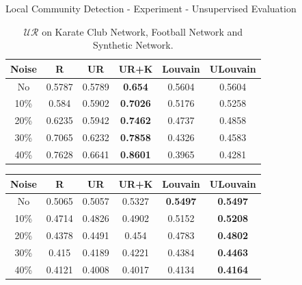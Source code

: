 \documentclass[9pt]{beamer}
\begin{document}
\begin{frame}{Local Community Detection - Experiment - Unsupervised Evaluation}

\tiny

\begin{table}[h]
\centering
\caption{$\mathcal{UR}$ on Karate Club Network, Football Network and Synthetic Network.}
\label{unsupervised_karate}
\begin{tabular}{c|c|c|c|c|c}
\hline
Noise & R      & UR     & UR+K            & Louvain & ULouvain \\ \hline
No    & 0.5787 & 0.5789 & \textbf{0.654}  & 0.5604  & 0.5604   \\ \hline
10\%  & 0.584  & 0.5902 & \textbf{0.7026} & 0.5176  & 0.5258   \\ \hline
20\%  & 0.6235 & 0.5942 & \textbf{0.7462} & 0.4737  & 0.4858   \\ \hline
30\%  & 0.7065 & 0.6232 & \textbf{0.7858} & 0.4326  & 0.4583   \\ \hline
40\%  & 0.7628 & 0.6641 & \textbf{0.8601} & 0.3965  & 0.4281   \\ \hline
\end{tabular}
\end{table}

\begin{table}[h]
\centering
\label{unsupervised_football}
\begin{tabular}{c|c|c|c|c|c}
\hline
Noise & R      & UR     & UR+K   & Louvain         & ULouvain        \\ \hline
No    & 0.5065 & 0.5057 & 0.5327 & \textbf{0.5497} & \textbf{0.5497} \\ \hline
10\%  & 0.4714 & 0.4826 & 0.4902 & 0.5152          & \textbf{0.5208} \\ \hline
20\%  & 0.4378 & 0.4491 & 0.454  & 0.4783          & \textbf{0.4802} \\ \hline
30\%  & 0.415  & 0.4189 & 0.4221 & 0.4384          & \textbf{0.4463} \\ \hline
40\%  & 0.4121 & 0.4008 & 0.4017 & 0.4134          & \textbf{0.4164} \\ \hline
\end{tabular}
\end{table}


\end{frame}
\end{document}
